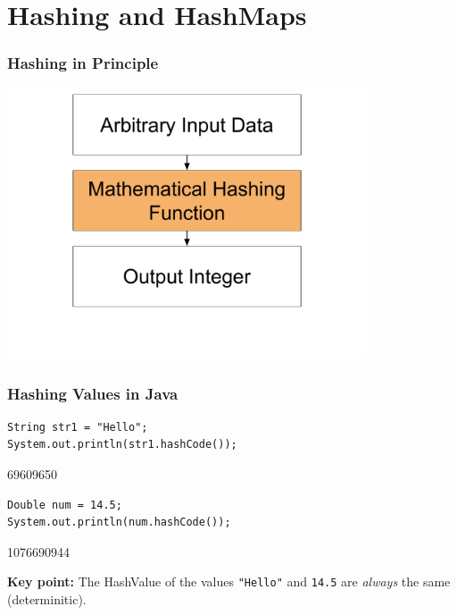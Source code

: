 \documentclass{beamer}
\begin{document}
\section{Hashing and HashMaps}
\begin{frame}[fragile]
    \frametitle{Hashing in Principle}
    \vfill
    \centering
    \includegraphics[width=0.8\textwidth]{./imgs/hashing.pdf}
    \vfill
\end{frame}

\begin{frame}[fragile]
    \frametitle{Hashing Values in Java}
    \begin{lstlisting}[frame=trBL]
String str1 = "Hello";
System.out.println(str1.hashCode());
    \end{lstlisting}
    \vspace{-0.25cm}
    \begin{shell}
69609650
    \end{shell}
    \hline
    \vfill
    \begin{lstlisting}[frame=trBL]
Double num = 14.5;
System.out.println(num.hashCode());
    \end{lstlisting}
    \vspace{-0.25cm}
    \begin{shell}
1076690944
    \end{shell}
    \hline
    \small
    \vspace{0.1cm}
    \textbf{Key point:} The HashValue of the values \lstinline|"Hello"| and \lstinline|14.5| are \textit{always} the same (determinitic).
\end{frame}
\end{document}
